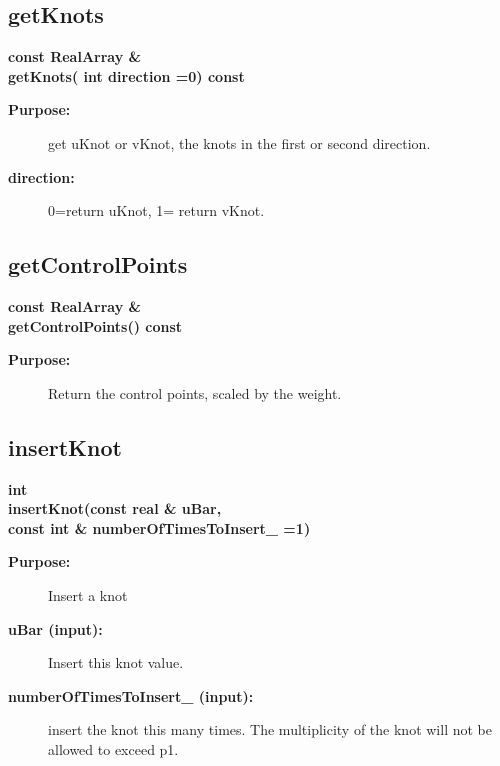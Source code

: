 \subsection{getKnots}
 
\begin{flushleft} \textbf{%
const RealArray \&  \\ 
\settowidth{\NurbsMappingIncludeArgIndent}{getKnots(}%
getKnots( int direction  =0) const
}\end{flushleft}
\begin{description}
\item[{\bf Purpose:}]  get uKnot or vKnot, the knots in the first or second direction.
\item[{\bf direction:}]  0=return uKnot, 1= return vKnot.
\end{description}
\subsection{getControlPoints}
 
\begin{flushleft} \textbf{%
const RealArray \&  \\ 
\settowidth{\NurbsMappingIncludeArgIndent}{getControlPoints(}%
getControlPoints() const
}\end{flushleft}
\begin{description}
\item[{\bf Purpose:}]  
    Return the control points, scaled by the weight.
\end{description}
\subsection{insertKnot}
 
\begin{flushleft} \textbf{%
int  \\ 
\settowidth{\NurbsMappingIncludeArgIndent}{insertKnot(}%
insertKnot(const real \& uBar, \\ 
\hspace{\NurbsMappingIncludeArgIndent}const int \& numberOfTimesToInsert\_  =1)
}\end{flushleft}
\begin{description}
\item[{\bf Purpose:}]  Insert a knot
\item[{\bf uBar (input):}]  Insert this knot value.
\item[{\bf numberOfTimesToInsert\_ (input):}]  insert the knot this many times. The multiplicity
    of the knot will not be allowed to exceed p1.
\end{description}

